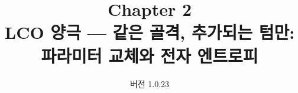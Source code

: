 

\renewcommand{\theequation}{2.\arabic{equation}}
\renewcommand{\thesection}{2.\arabic{section}}

\title{\textbf{\LARGE Chapter 2}\\[0.35em]\Large LCO 양극 --- 같은 골격, 추가되는 텀만: 파라미터 교체와 전자 엔트로피}
\author{}
\date{\normalsize 버전 1.0.23}


\maketitle












